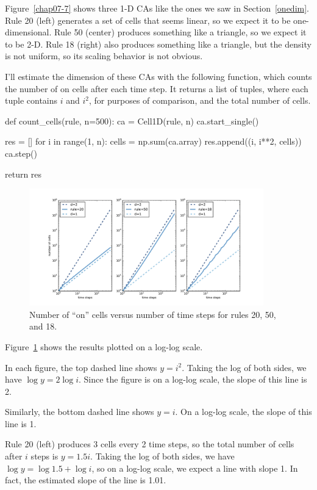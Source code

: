 \documentclass[12pt]{book}
\theoremstyle{exercise}
\begin{document}
Figure~\ref{chap07-7} shows three 1-D CAs like the ones we saw
in Section~\ref{onedim}.  Rule 20 (left) generates
a set of cells that seems linear, so we expect it to be one-dimensional.  Rule 50 (center) produces something like a triangle, so
we expect it to be 2-D.  Rule 18 (right) also produces something like a
triangle, but the density is not uniform, so its scaling behavior is
not obvious.

I'll estimate the dimension of these CAs with the following function,
which counts the number of on cells after each time step.
It returns a list of tuples, where each tuple contains $i$ and
$i^2$, for purposes of comparison, and the total number of cells.

\begin{code}
def count_cells(rule, n=500):
    ca = Cell1D(rule, n)
    ca.start_single()

    res = []
    for i in range(1, n):
        cells = np.sum(ca.array)
        res.append((i, i**2, cells))
        ca.step()

    return res
\end{code}

\begin{figure}
\centerline{\includegraphics[height=2in]{figs/chap07-8.pdf}}
\caption{Number of ``on'' cells versus number of time steps for
rules 20, 50, and 18.}
\label{chap07-8}
\end{figure}

Figure~\ref{chap07-8} shows the results plotted on a log-log scale.

In each figure, the top dashed line shows $y = i^2$.  Taking
the log of both sides, we have $\log y = 2 \log i$.  Since the
figure is on a log-log scale, the slope of this line is 2.

Similarly, the bottom dashed line shows $y = i$.  On a log-log
scale, the slope of this line is 1.

Rule 20 (left) produces 3 cells every 2 time steps, so the total number
of cells after $i$ steps is $y = 1.5 i$.  Taking the log of both
sides, we have $\log y = \log 1.5 + \log i$, so on a log-log
scale, we expect a line with slope 1.  In fact, the estimated
slope of the line is 1.01.
\end{document}
